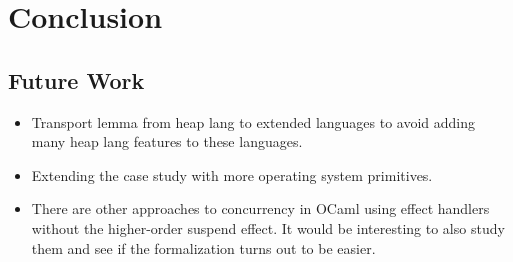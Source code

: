 \section{Conclusion}
\label{sec:conclusion}

\subsection{Future Work}
\begin{itemize}
    \item Transport lemma from heap lang to extended languages to avoid adding many heap lang features to these languages.
    \item Extending the case study with more operating system primitives.
    \item There are other approaches to concurrency in OCaml using effect handlers without the higher-order suspend effect. It would be interesting to also study them and see if the formalization
          turns out to be easier.
\end{itemize}